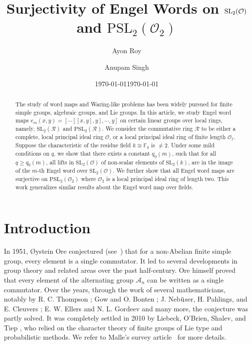 \documentclass[10pt,twoside]{amsart}
\title[Engel word on $\SL_2(\mathcal{O})$ and $\mathrm{PSL}_2(\mathcal{O}_2)$]{Surjectivity of Engel Words on $\SL_2(\mathcal{O})$ and $\mathrm{PSL}_2(\mathcal{O}_2)$}
\date{\today}
\author[Roy]{Ayon Roy}
\author[Singh]{Anupam Singh}
\date{\today}
\newcommand{\SL}{\mathrm{SL}}
\theoremstyle{definition}
\theoremstyle{definition}
\begin{document}
\begin{abstract}
The study of word maps and Waring-like problems has been widely pursued for finite simple groups, algebraic groups, and Lie groups. In this article, we study Engel word maps $e_{m}(x, y) = \left[\cdots\left[[x, y], y \right], \cdots, y \right]$ on certain linear groups over local rings, namely, $\mathrm{SL}_2(\mathcal R)$ and $\mathrm{PSL}_2(\mathcal R)$. We consider the commutative ring $\mathcal {R} $ to be either a complete, local principal ideal ring $\mathcal O$, or a local principal ideal ring of finite length $\mathcal O_\ell$. Suppose the characteristic of the residue field $k\cong \mathbb F_q$ is $\neq 2$. Under some mild conditions on $q$, we show that there exists a constant $q_0(m)$, such that for all $q \geq q_0(m)$, all lifts in $\SL_2(\mathcal{O})$ of non-scalar elements of $\SL_2(k)$, are in the image of the $m$-th Engel word over $\SL_2(\mathcal{O})$. We further show that all Engel word maps are surjective on $\text{PSL}_2(\mathcal{O}_2)$ where $\mathcal{O}_2$ is a local principal ideal ring of length two. This work generalizes similar results about the Engel word map over fields. 
\end{abstract}

\maketitle

\section{Introduction}

In 1951, {\O}ystein Ore conjectured (see~\cite{Ore1951}) that for a non-Abelian finite simple group, every element is a single commutator. It led to several developments in group theory and related areas over the past half-century. Ore himself proved that every element of the alternating group $\mathcal A_n$  can be written as a single commutator. Over the years, through the work of several mathematicians, notably by R. C. Thompson \cite{Thompson1961, Thompson1962};  Gow and O. Bonten \cite{Bonten1993}; J. Neb$\Ddot{\text{u}}$ser, H. Pahlings, and E. Cleuvers \cite{NeubuserPahlingsCleuvers1984};  E. W. Ellers and N. L. Gordeev \cite{EllersGordeev1998} and many more, the conjecture was partly solved. It was completely settled in 2010 by Liebeck, O’Brien, Shalev, and Tiep \cite{LiebeckBrienShalev10}, who relied on the character theory of finite groups of Lie type and probabilistic methods. We refer to Malle's survey article~\cite{Malle14} for more details. 
\end{document}
